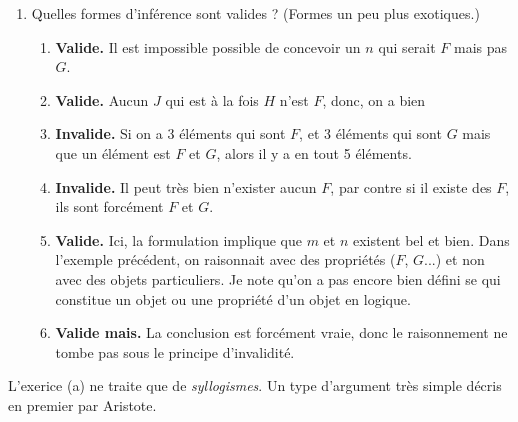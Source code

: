 \documentclass[fleqn,a4paper,nobib]{tufte-handout}
\begin{document}
\begin{enumerate}[label=(\alph*)]
\begin{enumerate}[label=(\arabic*)]
        \end{enumerate}
    \item Quelles formes d'inférence sont valides ? (Formes un peu plus exotiques.)
        \begin{enumerate}[label=(\arabic*)]
            \item {}
            \textbf{Valide.} Il est impossible possible de concevoir un $n$ qui serait $F$ mais pas $G$.
            \item {}
            \textbf{Valide.} Aucun $J$ qui est à la fois $H$ n'est $F$, donc, on a bien 
            \item {} \textbf{Invalide.} Si on a 3 éléments qui sont $F$,
            et 3 éléments qui sont $G$ mais que un élément est $F$ et $G$, alors il y a en tout 5 éléments.
            \item {} \textbf{Invalide.}
            Il peut très bien n'exister aucun $F$, par contre si il existe des $F$, ils sont forcément $F$ et $G$.
            \item {} \textbf{Valide.}
            Ici, la formulation implique que $m$ et $n$ existent bel et bien. Dans l'exemple précédent,
            on raisonnait avec des propriétés ($F$, $G$...) et non avec des objets particuliers.
            Je note qu'on a pas encore bien défini se qui constitue un objet ou une propriété d'un objet
            en logique.
            \item {} \textbf{Valide mais.}
            La conclusion est forcément vraie, donc le raisonnement ne tombe pas sous le principe
            d'invalidité.
        \end{enumerate}
\end{enumerate}

L'exerice (a) ne traite que de \textit{syllogismes}. Un type d'argument très simple
décris en premier par Aristote.
\end{document}
